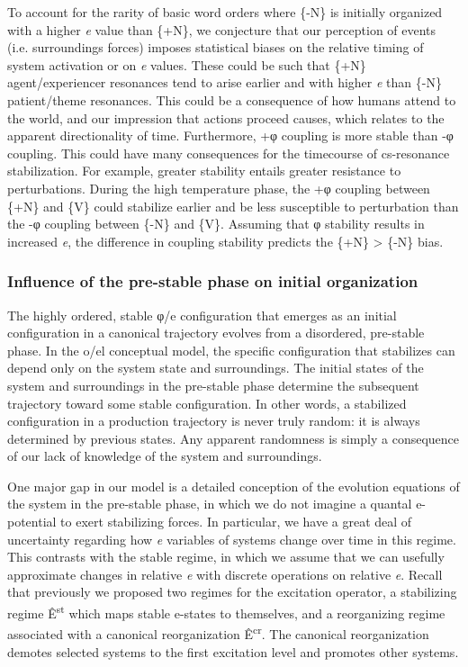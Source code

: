   To account for the rarity of basic word orders where \{-N\} is initially organized with a higher \textit{e} value than \{+N\}, we conjecture that our perception of events (i.e. surroundings forces) imposes statistical biases on the relative timing of system activation or on \textit{e} values. These could be such that \{+N\} agent/experiencer resonances tend to arise earlier and with higher \textit{e} than \{-N\} patient/theme resonances. This could be a consequence of how humans attend to the world, and our impression that actions proceed causes, which relates to the apparent directionality of time. Furthermore, +φ coupling is more stable than -φ coupling. This could have many consequences for the timecourse of cs-resonance stabilization. For example, greater stability entails greater resistance to perturbations. During the high temperature phase, the +φ coupling between \{+N\} and \{V\} could stabilize earlier and be less susceptible to perturbation than the -φ coupling between \{-N\} and \{V\}. Assuming that φ stability results in increased \textit{e}, the difference in coupling stability predicts the \{+N\} > \{-N\} bias.

\subsubsection{Influence of the pre-stable phase on initial organization}

The highly ordered, stable φ/e configuration that emerges as an initial configuration in a canonical trajectory evolves from a disordered, pre-stable phase. In the o/el conceptual model, the specific configuration that stabilizes can depend only on the system state and surroundings. The initial states of the system and surroundings in the pre-stable phase determine the subsequent trajectory toward some stable configuration. In other words, a stabilized configuration in a production trajectory is never truly random: it is always determined by previous states. Any apparent randomness is simply a consequence of our lack of knowledge of the system and surroundings.

  One major gap in our model is a detailed conception of the evolution equations of the system in the pre-stable phase, in which we do not imagine a quantal e-potential to exert stabilizing forces. In particular, we have a great deal of uncertainty regarding how \textit{e} variables of systems change over time in this regime. This contrasts with the stable regime, in which we assume that we can usefully approximate changes in relative \textit{e} with discrete operations on relative \textit{e}. Recall that previously we proposed two regimes for the excitation operator, a stabilizing regime Ê\textsuperscript{st} which maps stable e-states to themselves, and a reorganizing regime associated with a canonical reorganization Ê\textsuperscript{cr}. The canonical reorganization demotes selected systems to the first excitation level and promotes other systems. 

